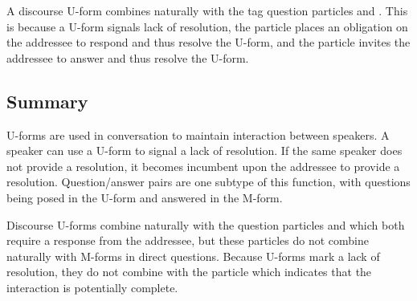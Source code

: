 A discourse U-form combines naturally with
the tag question particles  and .
This is because a U-form signals lack of resolution,
the particle  places an obligation on the addressee
to respond and thus resolve the U-form,
and the particle  invites the addressee to answer
and thus resolve the U-form.

\subsection{Summary}
U-forms are used in conversation to maintain interaction between speakers.
A speaker can use a U-form to signal a lack of resolution.
If the same speaker does not provide a resolution,
it becomes incumbent upon the addressee to provide a resolution.
Question/answer pairs are one subtype of this function,
with questions being posed in the U-form and answered in the M-form.

Discourse U-forms combine naturally with the question particles  and 
which both require a response from the addressee,
but these particles do not combine naturally with M-forms in direct questions.
Because U-forms mark a lack of resolution,
they do not combine with the particle 
which indicates that the interaction is potentially complete.
